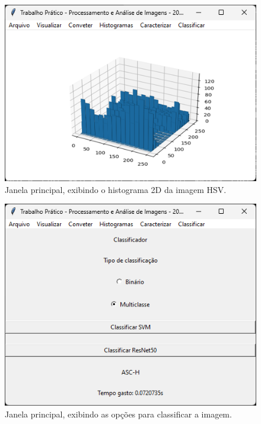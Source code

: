 \documentclass[12pt]{article}
\begin{document}
\begin{figure}
    \centering
    \includegraphics{Captura de tela 2024-06-10 095121.png}
    \caption{Janela principal, exibindo o histograma 2D da imagem HSV.}
    \label{fig:janela-principal-histograma-2d-hsv}
\end{figure}

\begin{figure}
    \centering
    \includegraphics{Captura de tela 2024-06-16 120712.png}
    \caption{Janela principal, exibindo as opções para classificar a imagem.}
    \label{fig:janela-principal-classificar-imagem}
\end{figure}
\end{document}
